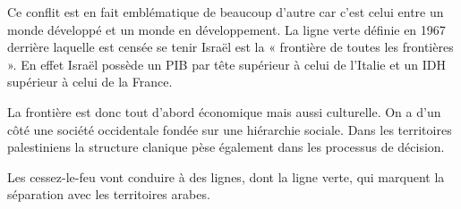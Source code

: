 \documentclass[a4paper,10pt]{article}
\begin{document}
		Ce conflit est en fait emblématique de beaucoup d'autre car c'est celui entre un monde développé et un monde en développement.
		La ligne verte définie en 1967 derrière laquelle est censée se tenir Israël est la « frontière de toutes les frontières ».
		En effet Israël possède un PIB par tête supérieur à celui de l'Italie et un IDH supérieur à celui de la France.

		La frontière est donc tout d'abord économique mais aussi culturelle.
		On a d'un côté une société occidentale fondée sur une hiérarchie sociale.
		Dans les territoires palestiniens la structure clanique pèse également dans les processus de décision.

		Les cessez-le-feu vont conduire à des lignes, dont la ligne verte, qui marquent la séparation avec les territoires arabes.
\end{document}
